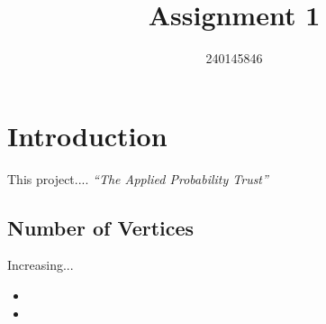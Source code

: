 \documentclass[11pt, a4paper]{amsart}
\title{Assignment 1}
\author{240145846}
\begin{document}
\maketitle

\section{Introduction}
This project....
\emph{``The Applied Probability Trust''}

\subsection{Number of Vertices}
Increasing...

\begin{itemize}
  \item 
  \item 
\end{itemize}

\begin{align*}
\end{align*}
\end{document}
